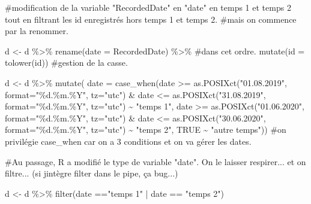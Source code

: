 \documentclass[
  letterpaper,
  DIV=11,
  numbers=noendperiod]{scrreprt}
\newenvironment{Shaded}{\begin{snugshade}}{\end{snugshade}}
\newcommand{\AttributeTok}[1]{\textcolor[rgb]{0.40,0.45,0.13}{#1}}
\newcommand{\CommentTok}[1]{\textcolor[rgb]{0.37,0.37,0.37}{#1}}
\newcommand{\ConstantTok}[1]{\textcolor[rgb]{0.56,0.35,0.01}{#1}}
\newcommand{\FunctionTok}[1]{\textcolor[rgb]{0.28,0.35,0.67}{#1}}
\newcommand{\NormalTok}[1]{\textcolor[rgb]{0.00,0.23,0.31}{#1}}
\newcommand{\OtherTok}[1]{\textcolor[rgb]{0.00,0.23,0.31}{#1}}
\newcommand{\SpecialCharTok}[1]{\textcolor[rgb]{0.37,0.37,0.37}{#1}}
\newcommand{\StringTok}[1]{\textcolor[rgb]{0.13,0.47,0.30}{#1}}
\begin{document}
\begin{Shaded}
\begin{Highlighting}[]
\CommentTok{\#modification de la variable "RecordedDate" en "date" en temps 1 et temps 2 tout en filtrant les id enregistrés hors temps 1 et temps 2.}
\CommentTok{\#mais on commence par la renommer.}

\NormalTok{d }\OtherTok{\textless{}{-}}\NormalTok{ d }\SpecialCharTok{\%\textgreater{}\%} 
  \FunctionTok{rename}\NormalTok{(}\AttributeTok{date =}\NormalTok{ RecordedDate) }\SpecialCharTok{\%\textgreater{}\%}  \CommentTok{\#dans cet ordre.}
  \FunctionTok{mutate}\NormalTok{(}\AttributeTok{id =} \FunctionTok{tolower}\NormalTok{(id)) }\CommentTok{\#gestion de la casse.}

\NormalTok{d }\OtherTok{\textless{}{-}}\NormalTok{ d }\SpecialCharTok{\%\textgreater{}\%} 
  \FunctionTok{mutate}\NormalTok{(}
    \AttributeTok{date =} \FunctionTok{case\_when}\NormalTok{(date }\SpecialCharTok{\textgreater{}=} \FunctionTok{as.POSIXct}\NormalTok{(}\StringTok{"01.08.2019"}\NormalTok{, }\AttributeTok{format=}\StringTok{"\%d.\%m.\%Y"}\NormalTok{, }\AttributeTok{tz=}\StringTok{"utc"}\NormalTok{) }\SpecialCharTok{\&}\NormalTok{ date }\SpecialCharTok{\textless{}=} \FunctionTok{as.POSIXct}\NormalTok{(}\StringTok{"31.08.2019"}\NormalTok{, }\AttributeTok{format=}\StringTok{"\%d.\%m.\%Y"}\NormalTok{, }\AttributeTok{tz=}\StringTok{"utc"}\NormalTok{) }\SpecialCharTok{\textasciitilde{}} \StringTok{"temps 1"}\NormalTok{,}
\NormalTok{                     date }\SpecialCharTok{\textgreater{}=} \FunctionTok{as.POSIXct}\NormalTok{(}\StringTok{"01.06.2020"}\NormalTok{, }\AttributeTok{format=}\StringTok{"\%d.\%m.\%Y"}\NormalTok{, }\AttributeTok{tz=}\StringTok{"utc"}\NormalTok{) }\SpecialCharTok{\&}\NormalTok{ date }\SpecialCharTok{\textless{}=} \FunctionTok{as.POSIXct}\NormalTok{(}\StringTok{"30.06.2020"}\NormalTok{, }\AttributeTok{format=}\StringTok{"\%d.\%m.\%Y"}\NormalTok{, }\AttributeTok{tz=}\StringTok{"utc"}\NormalTok{) }\SpecialCharTok{\textasciitilde{}} \StringTok{"temps 2"}\NormalTok{,}
                     \ConstantTok{TRUE} \SpecialCharTok{\textasciitilde{}} \StringTok{"autre temps"}\NormalTok{)) }\CommentTok{\#on privilégie case\_when car on a 3 conditions et on va gérer les dates.}

\CommentTok{\#Au passage, R a modifié le type de variable "date". On le laisser respirer... et on filtre... (si j\textquotesingle{}intègre filter dans le pipe, ça bug...)}

\NormalTok{d }\OtherTok{\textless{}{-}}\NormalTok{ d }\SpecialCharTok{\%\textgreater{}\%} \FunctionTok{filter}\NormalTok{(date }\SpecialCharTok{==}\StringTok{"temps 1"} \SpecialCharTok{|}\NormalTok{ date }\SpecialCharTok{==} \StringTok{"temps 2"}\NormalTok{)}
\end{Highlighting}
\end{Shaded}
\end{document}

